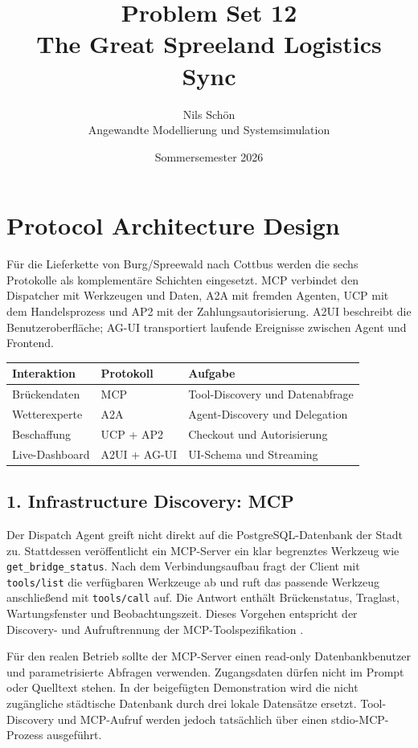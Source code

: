 \documentclass[11pt,a4paper]{article}
\title{\textbf{Problem Set 12}\\[0.25em]
\large The Great Spreeland Logistics Sync}
\author{Nils Schön\\Angewandte Modellierung und Systemsimulation}
\date{Sommersemester 2026}
\begin{document}
\maketitle

\section{Protocol Architecture Design}

Für die Lieferkette von Burg/Spreewald nach Cottbus werden die sechs
Protokolle als komplementäre Schichten eingesetzt. MCP verbindet den
Dispatcher mit Werkzeugen und Daten, A2A mit fremden Agenten, UCP mit dem
Handelsprozess und AP2 mit der Zahlungsautorisierung. A2UI beschreibt die
Benutzeroberfläche; AG-UI transportiert laufende Ereignisse zwischen Agent
und Frontend.

\begin{center}
\begin{tabular}{lll}
\toprule
\textbf{Interaktion} & \textbf{Protokoll} & \textbf{Aufgabe}\\
\midrule
Brückendaten & MCP & Tool-Discovery und Datenabfrage\\
Wetterexperte & A2A & Agent-Discovery und Delegation\\
Beschaffung & UCP + AP2 & Checkout und Autorisierung\\
Live-Dashboard & A2UI + AG-UI & UI-Schema und Streaming\\
\bottomrule
\end{tabular}
\end{center}

\subsection{1. Infrastructure Discovery: MCP}

Der Dispatch Agent greift nicht direkt auf die PostgreSQL-Datenbank der Stadt
zu. Stattdessen veröffentlicht ein MCP-Server ein klar begrenztes Werkzeug
wie \texttt{get\_bridge\_status}. Nach dem Verbindungsaufbau fragt der Client
mit \texttt{tools/list} die verfügbaren Werkzeuge ab und ruft das passende
Werkzeug anschließend mit \texttt{tools/call} auf. Die Antwort enthält
Brückenstatus, Traglast, Wartungsfenster und Beobachtungszeit. Dieses Vorgehen
entspricht der Discovery- und Aufruftrennung der MCP-Toolspezifikation
\cite{mcp}.

Für den realen Betrieb sollte der MCP-Server einen read-only
Datenbankbenutzer und parametrisierte Abfragen verwenden. Zugangsdaten dürfen
nicht im Prompt oder Quelltext stehen. In der beigefügten Demonstration wird
die nicht zugängliche städtische Datenbank durch drei lokale Datensätze
ersetzt. Tool-Discovery und MCP-Aufruf werden jedoch tatsächlich über einen
stdio-MCP-Prozess ausgeführt.
\end{document}
